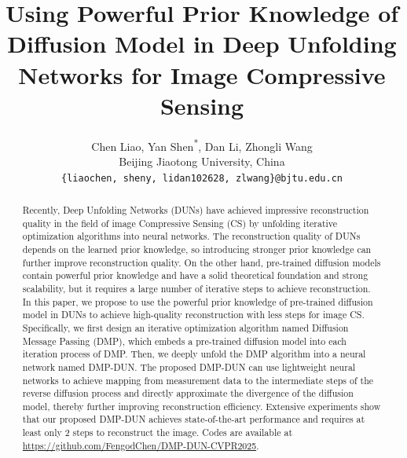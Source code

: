 \documentclass[10pt,twocolumn,letterpaper]{article}
\title{Using Powerful Prior Knowledge of Diffusion Model in Deep Unfolding Networks for Image Compressive Sensing}
\author{Chen Liao, Yan Shen\textsuperscript{*}, Dan Li, Zhongli Wang\\
	Beijing Jiaotong University, China\\
	{\tt\small \{liaochen, sheny, lidan102628, zlwang\}@bjtu.edu.cn}
}
\begin{document}
\maketitle

\begin{abstract}
	Recently, Deep Unfolding Networks (DUNs) have achieved impressive reconstruction quality in the field of image Compressive Sensing (CS) by unfolding iterative optimization algorithms into neural networks. The reconstruction quality of DUNs depends on the learned prior knowledge, so introducing stronger prior knowledge can further improve reconstruction quality. On the other hand, pre-trained diffusion models contain powerful prior knowledge and have a solid theoretical foundation and strong scalability, but it requires a large number of iterative steps to achieve reconstruction. In this paper, we propose to use the powerful prior knowledge of pre-trained diffusion model in DUNs to achieve high-quality reconstruction with less steps for image CS. Specifically, we first design an iterative optimization algorithm named Diffusion Message Passing (DMP), which embeds a pre-trained diffusion model into each iteration process of DMP. Then, we deeply unfold the DMP algorithm into a neural network named DMP-DUN. The proposed DMP-DUN can use lightweight neural networks to achieve mapping from measurement data to the intermediate steps of the reverse diffusion process and directly approximate the divergence of the diffusion model, thereby further improving reconstruction efficiency. Extensive experiments show that our proposed DMP-DUN achieves state-of-the-art performance and requires at least only 2 steps to reconstruct the image. Codes are available at \url{https://github.com/FengodChen/DMP-DUN-CVPR2025}.
\end{abstract}
\end{document}
